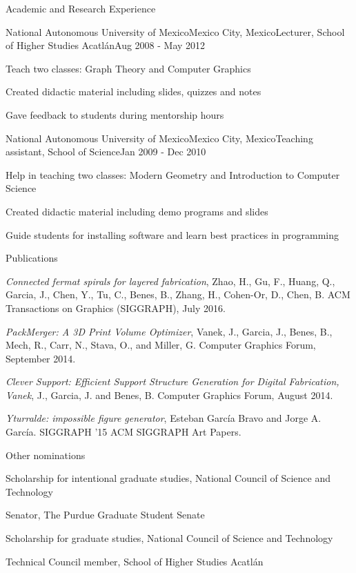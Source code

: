 \documentclass{resume} %
\begin{document}
\begin{rSection}{Academic and Research Experience}
	\begin{rSubsection}{National Autonomous University of Mexico}{Mexico City, Mexico}{Lecturer, School of Higher Studies Acatl\'{a}n}{Aug 2008 - May 2012}
	\item Teach two classes: Graph Theory and Computer Graphics
	\item Created didactic material including slides, quizzes and notes
	\item Gave feedback to students during mentorship hours
	\end{rSubsection}
	
	\begin{rSubsection}{National Autonomous University of Mexico}{Mexico City, Mexico}{Teaching assistant, School of Science}{Jan 2009 - Dec 2010}
	\item Help in teaching two classes: Modern Geometry and Introduction to Computer Science
	\item Created didactic material including demo programs and slides
	\item Guide students for installing software and learn best practices in programming
	\end{rSubsection}

\end{rSection}


\begin{rSection}{Publications} \itemsep -4pt
\item \textit{Connected fermat spirals for layered fabrication}, Zhao, H., Gu, F., Huang, Q., Garcia, J., Chen, Y., Tu, C., Benes, B., Zhang, H., Cohen-Or, D., Chen, B. ACM Transactions on Graphics (SIGGRAPH), July 2016.
\item \textit{PackMerger: A 3D Print Volume Optimizer}, Vanek, J., Garcia, J., Benes, B., Mech, R., Carr, N., Stava, O., and Miller, G. Computer Graphics Forum, September 2014.
\item \textit{Clever Support: Efficient Support Structure Generation for Digital Fabrication, Vanek}, J., Garcia, J. and Benes, B. Computer Graphics Forum, August 2014.
\item \textit{Yturralde: impossible figure generator}, Esteban Garc\'{i}a Bravo and Jorge A. Garc\'{i}a. SIGGRAPH '15 ACM SIGGRAPH Art Papers.
\end{rSection}

\begin{rSection}{Other nominations} \itemsep -8pt
\item Scholarship for intentional graduate studies, National Council of Science and Technology
\item Senator, The Purdue Graduate Student Senate
\item Scholarship for graduate studies, National Council of Science and Technology
\item Technical Council member, School of Higher Studies Acatl\'{a}n
\end{rSection}
\end{document}

